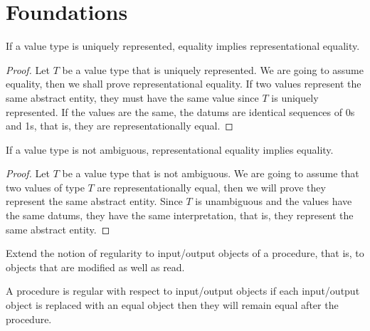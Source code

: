 
\chapter{Foundations}

\begin{lemma}
	If a value type is uniquely represented, equality implies representational equality.
\end{lemma}

\begin{proof}
	Let $T$ be a value type that is uniquely represented. We are going to assume equality,
	then we shall prove representational equality. If two values represent the same abstract entity,
	they must have the same value since $T$ is uniquely represented. If the values are the same, the datums
	are identical sequences of 0s and 1s, that is, they are representationally equal.
\end{proof}

\begin{lemma}
	If a value type is not ambiguous, representational equality implies equality.
\end{lemma}

\begin{proof}
	Let $T$ be a value type that is not ambiguous. We are going to assume that two values of type $T$ are
	representationally equal, then we will prove they represent the same abstract entity. Since $T$ is
	unambiguous and the values have the same datums, they have the same interpretation, that is, they
	represent the same abstract entity.
\end{proof}

\begin{exercise}
	Extend the notion of regularity to input/output objects of a procedure, that is, to objects that are
	modified as well as read.
\end{exercise}

\begin{solution}
	A procedure is regular with respect to input/output objects if each input/output object is replaced
	with an equal object then they will remain equal after the procedure.
\end{solution}
